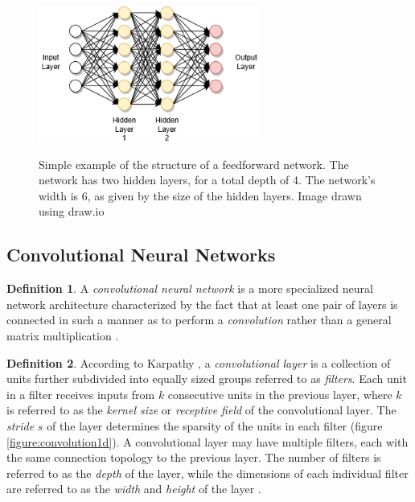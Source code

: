 \documentclass[12pt, titlepage]{report}
\theoremstyle{definition}
\newtheorem{definition}{Definition}
\begin{document}
\begin{figure}
\centering
\includegraphics[width=0.65\textwidth]{img/feedforward_nn.png}\\
\caption{Simple example of the structure of a feedforward network. The network has two hidden layers, for a total depth of 4. The network's width is 6, as given by the size of the hidden layers. Image drawn using draw.io \cite{jgraph2018draw}}
\label{figure:feedforward}
\end{figure}



\subsection{Convolutional Neural Networks}
\begin{definition}
A \emph{convolutional neural network} is a more specialized neural network architecture characterized by the fact that at least one pair of layers is connected in such a manner as to perform a \textit{convolution} rather than a general matrix multiplication \cite[p. 326]{goodfellow2016deep}.
\end{definition}

\begin{definition}
According to Karpathy \cite{karpathy2017cs231n}, a \emph{convolutional layer} is a collection of units further subdivided into equally sized groups referred to as \emph{filters}. Each unit in a filter receives inputs from $k$ consecutive units in the previous layer, where $k$ is referred to as the \emph{kernel size} or \emph{receptive field} of the convolutional layer. The \emph{stride} $s$ of the layer determines the sparsity of the units in each filter (figure \ref{figure:convolution1d}). A convolutional layer may have multiple filters, each with the same connection topology to the previous layer. The number of filters is referred to as the \emph{depth} of the layer, while the dimensions of each individual filter are referred to as the \emph{width} and \emph{height} of the layer \cite[Convolutional Neural Networks: Architectures, Convolution / Pooling Layers]{karpathy2017cs231n}.
\end{definition}
\end{document}
